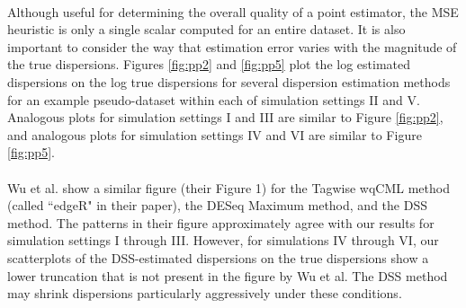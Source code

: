 \documentclass[10pt]{article}
\begin{document}
\paragraph{} \indent Although useful for determining the overall quality of a point estimator, the MSE heuristic is only a single scalar computed for an entire dataset. It is also important to consider the way that estimation error varies with the magnitude of the true dispersions. Figures \ref{fig:pp2} and \ref{fig:pp5} plot the log estimated dispersions on the log true dispersions for several dispersion estimation methods for an example pseudo-dataset within each of simulation settings II and V. Analogous plots for simulation settings I and III are similar to Figure \ref{fig:pp2}, and analogous plots for simulation settings IV and VI are similar to Figure \ref{fig:pp5}. 



{\color{blue} \paragraph{} \indent Wu et al. \cite{dss} show a similar figure (their Figure 1) for the Tagwise wqCML method (called ``edgeR" in their paper), the DESeq Maximum method, and the DSS method. The patterns in their figure approximately agree with our results for simulation settings I through III. However, for simulations IV through VI, our scatterplots of the DSS-estimated dispersions on the true dispersions show a lower truncation that is not present in the figure by Wu et al. The DSS method may shrink dispersions particularly aggressively under these conditions. }



\end{document}
